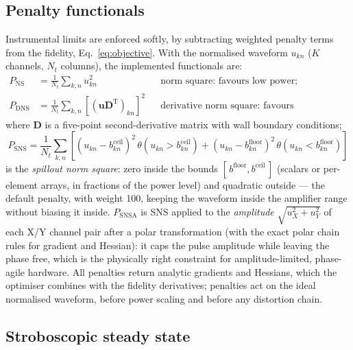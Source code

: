 \documentclass[11pt,a4paper]{article}
\begin{document}
\subsection{Penalty functionals}
\label{sec:penalties}

Instrumental limits are enforced softly, by subtracting weighted penalty
terms from the fidelity, Eq.~\eqref{eq:objective}. With the normalised
waveform $u_{kn}$ ($K$ channels, $N_t$ columns), the implemented
functionals are:
\begin{align}
  P_{\mathrm{NS}}&=\frac{1}{N_t}\sum_{k,n}u_{kn}^{2}
  &&\text{norm square: favours low power;}\\
  P_{\mathrm{DNS}}&=\frac{1}{N_t}\sum_{k,n}
    \left[(\mathbf{u}\mathbf{D}^{\mathrm{T}})_{kn}\right]^{2}
  &&\text{derivative norm square: favours smoothness,}
\end{align}
where $\mathbf{D}$ is a five-point second-derivative matrix with wall
boundary conditions;
\begin{equation}
  P_{\mathrm{SNS}}=\frac{1}{N_t}\sum_{k,n}
  \left[(u_{kn}-b^{\mathrm{ceil}}_{kn})^2\,\theta(u_{kn}>b^{\mathrm{ceil}}_{kn})
       +(u_{kn}-b^{\mathrm{floor}}_{kn})^2\,\theta(u_{kn}<b^{\mathrm{floor}}_{kn})
  \right]
\end{equation}
is the \emph{spillout norm square}: zero inside the bounds
$[\,b^{\mathrm{floor}},b^{\mathrm{ceil}}\,]$ (scalars or per-element
arrays, in fractions of the power level) and quadratic outside --- the
default penalty, with weight 100, keeping the waveform inside the
amplifier range without biasing it inside. $P_{\mathrm{SNSA}}$ is SNS
applied to the \emph{amplitude} $\sqrt{u_X^2+u_Y^2}$ of each X/Y channel
pair after a polar transformation (with the exact polar chain rules for
gradient and Hessian): it caps the pulse amplitude while leaving the
phase free, which is the physically right constraint for
amplitude-limited, phase-agile hardware. All penalties return analytic
gradients and Hessians, which the optimiser combines with the fidelity
derivatives; penalties act on the ideal normalised waveform, before power
scaling and before any distortion chain.

\subsection{Stroboscopic steady state}
\label{sec:steady}
\end{document}
